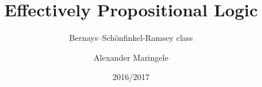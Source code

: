 \author[Alexander Maringele]{
	Alexander Maringele%
	}
\subtitle{Bernays–Schönfinkel-Ramsey class}
\title{Effectively Propositional Logic}

\date{2016/2017}